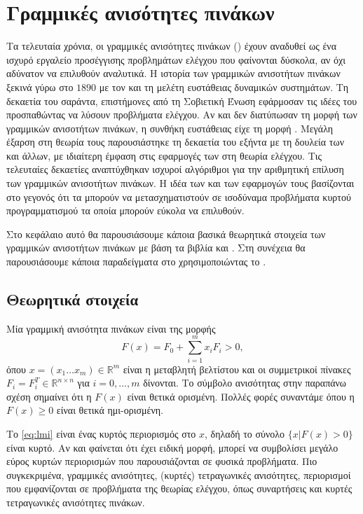 \chapter{Γραμμικές ανισότητες πινάκων}\label{ch:lmi}
Τα τελευταία χρόνια, οι γραμμικές ανισότητες πινάκων () έχουν αναδυθεί
ως ένα ισχυρό εργαλείο προσέγγισης προβλημάτων ελέγχου που φαίνονται δύσκολα, αν
όχι αδύνατον να επιλυθούν αναλυτικά. Η ιστορία των γραμμικών ανισοτήτων πινάκων
ξεκινά γύρω στο \(1890\) με τον  και τη μελέτη ευστάθειας δυναμικών
συστημάτων. Τη δεκαετία του σαράντα, επιστήμονες από τη Σοβιετική Ένωση
εφάρμοσαν τις ιδέες του  προσπαθώντας να λύσουν προβλήματα ελέγχου.
Αν και δεν διατύπωσαν τη μορφή των γραμμικών ανισοτήτων πινάκων, η συνθήκη
ευστάθειας είχε τη μορφή . Μεγάλη έξαρση στη θεωρία τους
παρουσιάστηκε τη δεκαετία του εξήντα με τη δουλεία των  και άλλων, με ιδιαίτερη έμφαση στις εφαρμογές των  στη θεωρία
ελέγχου. Τις τελευταίες δεκαετίες αναπτύχθηκαν ισχυροί αλγόριθμοι για την
αριθμητική επίλυση των γραμμικών ανισοτήτων πινάκων. Η ιδέα των  και των
εφαρμογών τους βασίζονται στο γεγονός ότι τα  μπορούν να
μετασχηματιστούν σε ισοδύναμα προβλήματα κυρτού προγραμματισμού τα οποία μπορούν
εύκολα να επιλυθούν.

Στο κεφάλαιο αυτό θα παρουσιάσουμε κάποια βασικά θεωρητικά στοιχεία των
γραμμικών ανισοτήτων πινάκων με βάση τα βιβλία \cite{boyd1994linear} και
\cite{scherer2011linear}. Στη συνέχεια θα παρουσιάσουμε κάποια
παραδείγματα  στο  χρησιμοποιώντας το .

\section{Θεωρητικά στοιχεία}
Μία γραμμική ανισότητα πινάκων είναι της μορφής
\begin{equation}\label{eq:lmi}
    F(x) = F_0 + \sum_{i=1}^m x_iF_i > 0,
\end{equation}
όπου \(x = (x_1 \dots x_m) \in \mathbb{R}^m\) είναι η μεταβλητή βελτίστου και οι
συμμετρικοί πίνακες \(F_i = F_i^T \in \mathbb{R}^{n \times n} \) για \(i = 0,
\dots, m \) δίνονται. Το σύμβολο ανισότητας στην παραπάνω σχέση σημαίνει ότι η
\(F(x)\) είναι θετικά ορισμένη. Πολλές φορές συναντάμε  όπου η \(F(x)
\geq 0\) είναι θετικά ημι-ορισμένη.

Το  \eqref{eq:lmi} είναι ένας κυρτός περιορισμός στο \(x\), δηλαδή το σύνολο
\( \{ x | F(x) > 0 \} \) είναι κυρτό. Αν και φαίνεται ότι  έχει
ειδική μορφή, μπορεί να συμβολίσει μεγάλο εύρος κυρτών περιορισμών που
παρουσιάζονται σε φυσικά προβλήματα. Πιο συγκεκριμένα, γραμμικές ανισότητες,
(κυρτές) τετραγωνικές ανισότητες, περιορισμοί που εμφανίζονται σε προβλήματα
της θεωρίας ελέγχου, όπως συναρτήσεις  και κυρτές τετραγωνικές
ανισότητες πινάκων.

